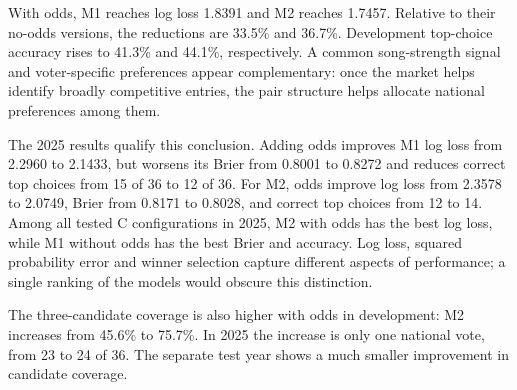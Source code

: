 \documentclass[11pt,a4paper]{article}
\begin{document}
With odds, M1 reaches log loss 1.8391 and M2 reaches 1.7457. Relative to their no-odds versions, the reductions are 33.5\% and 36.7\%. Development top-choice accuracy rises to 41.3\% and 44.1\%, respectively. A common song-strength signal and voter-specific preferences appear complementary: once the market helps identify broadly competitive entries, the pair structure helps allocate national preferences among them.

The 2025 results qualify this conclusion. Adding odds improves M1 log loss from 2.2960 to 2.1433, but worsens its Brier from 0.8001 to 0.8272 and reduces correct top choices from 15 of 36 to 12 of 36. For M2, odds improve log loss from 2.3578 to 2.0749, Brier from 0.8171 to 0.8028, and correct top choices from 12 to 14. Among all tested C configurations in 2025, M2 with odds has the best log loss, while M1 without odds has the best Brier and accuracy. Log loss, squared probability error and winner selection capture different aspects of performance; a single ranking of the models would obscure this distinction.

\begin{table}[H]\centering\small
\caption{Task C selection accuracy. ``Top three'' means that the actual national winner is among the three highest-probability recipients. Development percentages are means of annual rates; 2025 entries are exact counts of national votes. These measures supplement the probability scores in Table~\ref{tab:C}.}\label{tab:Caccuracy}

\end{table}
The three-candidate coverage is also higher with odds in development: M2 increases from 45.6\% to 75.7\%. In 2025 the increase is only one national vote, from 23 to 24 of 36. The separate test year shows a much smaller improvement in candidate coverage.
\end{document}
